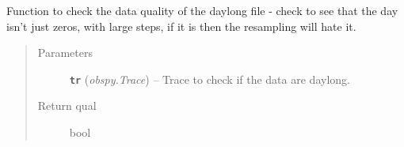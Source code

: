 \documentclass[a4paper,10pt,english]{sphinxmanual}
\begin{document}
\begin{fulllineitems}
\label{utils:pre_processing._check_daylong}
Function to check the data quality of the daylong file - check to see that
the day isn't just zeros, with large steps, if it is then the resampling will
hate it.
\begin{quote}\begin{description}
\item[{Parameters}] \leavevmode
\textbf{\texttt{tr}} (\emph{obspy.Trace}) -- Trace to check if the data are daylong.

\item[{Return qual}] \leavevmode
bool

\end{description}\end{quote}

\end{fulllineitems}

\end{document}
